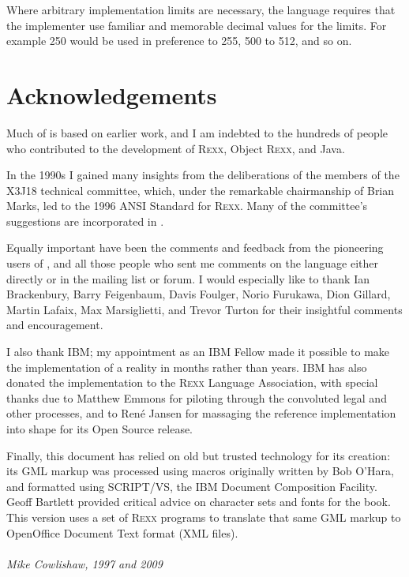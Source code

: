 Where arbitrary implementation limits are necessary, the language
requires that the implementer use familiar and memorable decimal
values for the limits. For example 250 would be used in preference to
255, 500 to 512, and so on.

\section{Acknowledgements}
Much of \nr{} is based on earlier work, and I am indebted to the hundreds of people who contributed to the development of R\textsc{exx}, Object R\textsc{exx}, and Java.

In the 1990s I gained many insights from the deliberations of the members of the X3J18 technical committee, which, under the remarkable chairmanship of Brian Marks, led to the 1996 ANSI Standard for R\textsc{exx}. Many of the committee's suggestions are incorporated in \nr{}.

Equally important have been the comments and feedback from the pioneering users of \nr{}, and all those people who sent me comments on the language either directly or in the \nr{} mailing list or forum. I would especially like to thank Ian Brackenbury, Barry Feigenbaum, Davis Foulger, Norio Furukawa, Dion Gillard, Martin Lafaix, Max Marsiglietti, and Trevor Turton for their insightful comments and encouragement.

I also thank IBM; my appointment as an IBM Fellow made it possible to make the implementation of \nr{} a reality in months rather than years. IBM has also donated the \nr{} implementation to the R\textsc{exx} Language Association, with special thanks due to Matthew Emmons for piloting \nr{} through the convoluted legal and other processes, and to Ren\'{e} Jansen for massaging the \nr{} reference implementation into shape for its Open Source release.

Finally, this document has relied on old but trusted technology for
its creation: its GML markup was processed using macros originally
written by Bob O'Hara, and formatted using SCRIPT/VS, the IBM Document
Composition Facility. Geoff Bartlett provided critical advice on
character sets and fonts for the \nr{} book. This version uses a set
of R\textsc{exx} programs to translate that same GML markup to OpenOffice Document Text format (XML files).
\\
\\
\emph{Mike Cowlishaw, 1997 and 2009}
